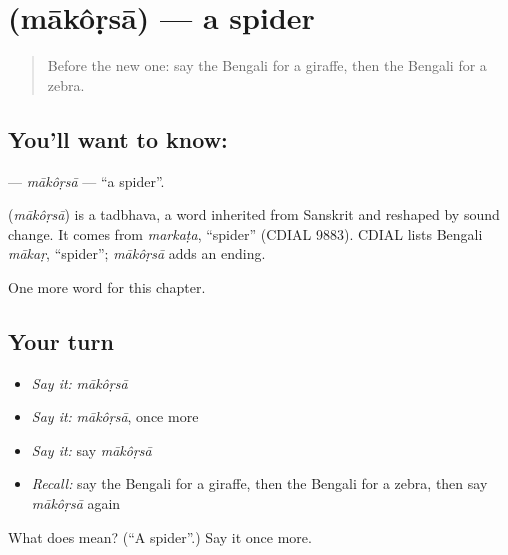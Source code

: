 \section[\texorpdfstring{\bn{মাকড়সা} (mākôṛsā)}{মাকড়সা (mākôṛsā)}]{ (mākôṛsā) — a spider}

\label{lesson:BN-C250-makorsa}



\begin{quote}
Before the new one: say the Bengali for a giraffe, then the Bengali for a zebra.
\end{quote}

\subsection*{You'll want to know: }
\textbf{} — \emph{mākôṛsā} — \textquotedblleft{}a spider\textquotedblright{}.

\begin{cousinweb}
\textbf{} (\emph{mākôṛsā}) is a tadbhava, a word inherited from Sanskrit and reshaped by sound change. It comes from \emph{markaṭa}, \textquotedblleft{}spider\textquotedblright{} (CDIAL 9883). CDIAL lists Bengali \emph{mākaṛ}, \textquotedblleft{}spider\textquotedblright{}; \emph{mākôṛsā} adds an ending.
\end{cousinweb}

\begin{grammarlens}[title={What you've built}]
One more word for this chapter.
\end{grammarlens}

\subsection*{Your turn}
\begin{itemize}
\raggedright
  \item \emph{Say it:} \emph{mākôṛsā}
  \item \emph{Say it:} \emph{mākôṛsā}, once more
  \item \emph{Say it:} say \emph{mākôṛsā}
  \item \emph{Recall:} say the Bengali for a giraffe, then the Bengali for a zebra, then say \emph{mākôṛsā} again
\end{itemize}

\begin{tcolorbox}[breakable,colback=teal!4,colframe=teal!35!black,title={Before you move on}]
What does  mean? (\textquotedblleft{}A spider\textquotedblright{}.) Say it once more.
\end{tcolorbox}
